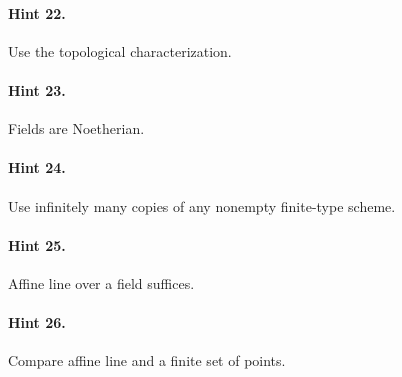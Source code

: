 \paragraph{Hint 22.} Use the topological characterization.

\paragraph{Hint 23.} Fields are Noetherian.

\paragraph{Hint 24.} Use infinitely many copies of any nonempty finite-type scheme.

\paragraph{Hint 25.} Affine line over a field suffices.

\paragraph{Hint 26.} Compare affine line and a finite set of points.
